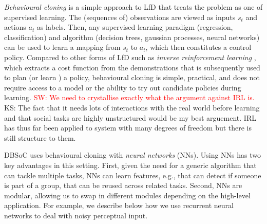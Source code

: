 \documentclass[letterpaper, 10 pt, conference]{ieeeconf}
\newcommand{\sw}[1]{\textcolor{red}{SW: #1}}
\newcommand{\ks}[1]{\textcolor{mypurp}{KS: #1}}
\begin{document}
\emph{Behavioural cloning} is a simple approach to LfD that treats the problem as one of supervised learning. The (sequences of) observations are viewed as inputs $s_t$ and actions $a_t$ as labels.  Then, any supervised learning paradigm (regression, classification) and algorithm (decision trees, gaussian processes, neural networks) \cite{bishop2006pattern} can be used to learn a mapping from $s_t$ to $a_t$, which then constitutes a control policy.  Compared to other forms of LfD such as \emph{inverse reinforcement learning} \cite{abbeel2004apprenticeship}, which extracts a cost function from the demonstrations that is subsequently used to plan (or learn \cite{boularias2011relative}) a policy, behavioural cloning is simple, practical, and does not require access to a model or the ability to try out candidate policies during learning. \sw{We need to crystallise exactly what the argument against IRL is.} \ks{The fact that it needs lots of interactions with the real world before learning and that social tasks are highly unstructured would be my best arguement. IRL has thus far been applied to system with many degrees of freedom but there is still structure to them.}

DBSoC uses behavioural cloning with \emph{neural networks} (NNs).  Using NNs has two key advantages in this setting.  First, given the need for a generic algorithm that can tackle multiple tasks, NNs can learn features, e.g., that can detect if someone is part of a group, that can be reused across related tasks.  Second, NNs are modular, allowing us to swap in different modules depending on the high-level application. For example, we describe below how we use
recurrent neural networks to deal with noisy perceptual input.


\end{document}
